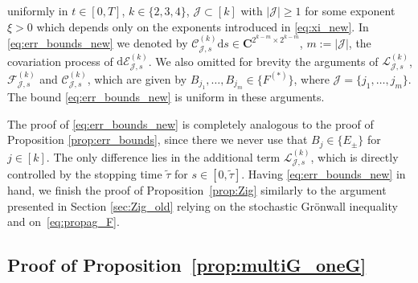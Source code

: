 \documentclass[10pt]{amsart}
\numberwithin{equation}{section}
\newcommand{\dif}{\mathrm{d}}
\newcommand{\C}{\mathbf{C}}
\begin{document}
uniformly in $t\in [0,T]$, $k\in \{2,3,4\}$, $\mathcal{J}\subset [k]$ with $|\mathcal{J}|\ge 1$ for some exponent $\xi>0$ which depends only on the exponents introduced in \eqref{eq:xi_new}. In \eqref{eq:err_bounds_new} we denoted by $\mathcal{C}^{(k)}_{\mathcal{J},s}\dif s\in\C^{2^{k-m}\times 2^{k-m}}$, $m:=|\mathcal{J}|$, the covariation process of $\dif\mathcal{E}^{(k)}_{\mathcal{J},s}$. We also omitted for brevity the arguments of $\mathcal{L}_{\mathcal{J},s}^{(k)}$, $\mathcal{F}_{\mathcal{J},s}^{(k)}$ and $\mathcal{C}^{(k)}_{\mathcal{J},s}$, which are given by  $B_{j_1},\ldots, B_{j_m}\in\{F^{(*)}\}$, where $\mathcal{J}=\{j_1,\ldots,j_m\}$. The bound \eqref{eq:err_bounds_new} is uniform in these arguments.


The proof of \eqref{eq:err_bounds_new} is completely analogous to the proof of Proposition \ref{prop:err_bounds}, since there we never use that $B_j\in \{E_\pm\}$ for $j\in [k]$. The only difference lies in the additional term $\mathcal{L}_{\mathcal{J},s}^{(k)}$, which is directly controlled by the stopping time $\widetilde{\tau}$ for $s\in [0,\widetilde{\tau}]$. Having \eqref{eq:err_bounds_new} in hand, we finish the proof of Proposition~\ref{prop:Zig} similarly to the argument presented in Section \ref{sec:Zig_old} relying on the stochastic Gr{\"o}nwall inequality and on~\eqref{eq:propag_F}.


\subsection{Proof of Proposition~\ref{prop:multiG_oneG}}
\label{sec:multiG_oneG}
\end{document}
